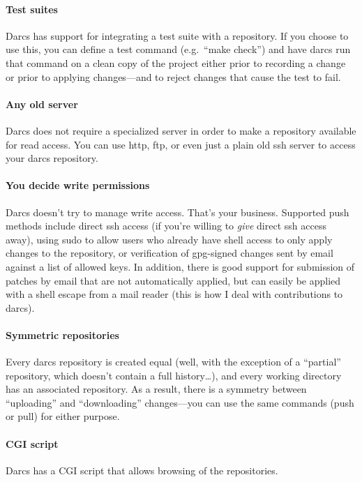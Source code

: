 \paragraph{Test suites}
Darcs has support for integrating a test suite with a repository.  If you
choose to use this, you can define a test command (e.g.\ ``make check'') and
have darcs run that command on a clean copy of the project either prior to
recording a change or prior to applying changes---and to reject changes
that cause the test to fail.

\paragraph{Any old server}
Darcs does not require a specialized server in order to make a repository
available for read access.  You can use http, ftp, or even just a plain old
ssh server to access your darcs repository.

\paragraph{You decide write permissions}
Darcs doesn't try to manage write access.  That's your business.  Supported
push methods include direct ssh access (if you're willing to \emph{give}
direct ssh access away), using sudo to allow users who already have shell
access to only apply changes to the repository, or verification of
gpg-signed changes sent by email against a list of allowed keys.  In
addition, there is good support for submission of patches by email that
are not automatically applied, but can easily be applied with a shell escape
from a mail reader (this is how I deal with contributions to darcs).

\paragraph{Symmetric repositories}
Every darcs repository is created equal (well, with the exception of a
``partial'' repository, which doesn't contain a full history\ldots), and every
working directory has an associated repository.  As a result, there is a
symmetry between ``uploading'' and ``downloading'' changes---you can use
the same commands (push or pull) for either purpose.

\paragraph{CGI script}
Darcs has a CGI script that allows browsing of the repositories.

